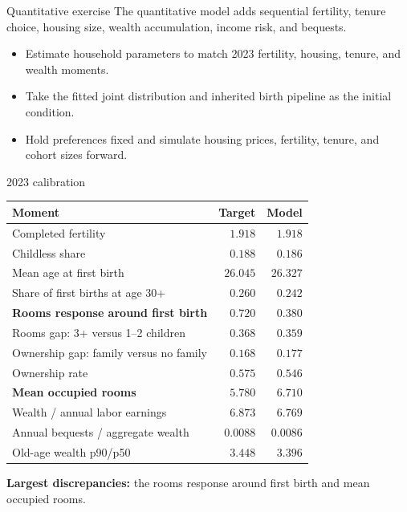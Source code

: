 \documentclass[11pt,aspectratio=169]{beamer}
\begin{document}
\begin{frame}{Quantitative exercise}
\small
The quantitative model adds sequential fertility, tenure choice, housing size, wealth accumulation, income risk, and bequests.

\begin{itemize}
  \setlength\itemsep{0.8em}
  \item Estimate household parameters to match 2023 fertility, housing, tenure, and wealth moments.
  \item Take the fitted joint distribution and inherited birth pipeline as the initial condition.
  \item Hold preferences fixed and simulate housing prices, fertility, tenure, and cohort sizes forward.
\end{itemize}
\end{frame}

\begin{frame}{2023 calibration}
\centering
\footnotesize
\renewcommand{\arraystretch}{1.00}
\begin{tabular}{@{}>{\raggedright\arraybackslash}p{}rr@{}}
\toprule
\textbf{Moment} & \textbf{Target} & \textbf{Model} \\
\midrule
Completed fertility & $1.918$ & $1.918$ \\
Childless share & $0.188$ & $0.186$ \\
Mean age at first birth & $26.045$ & $26.327$ \\
Share of first births at age 30+ & $0.260$ & $0.242$ \\
\midrule
\textbf{Rooms response around first birth} & \textbf{$0.720$} & \textbf{$0.380$} \\
Rooms gap: 3+ versus 1--2 children & $0.368$ & $0.359$ \\
Ownership gap: family versus no family & $0.168$ & $0.177$ \\
Ownership rate & $0.575$ & $0.546$ \\
\textbf{Mean occupied rooms} & \textbf{$5.780$} & \textbf{$6.710$} \\
\midrule
Wealth / annual labor earnings & $6.873$ & $6.769$ \\
Annual bequests / aggregate wealth & $0.0088$ & $0.0086$ \\
Old-age wealth p90/p50 & $3.448$ & $3.396$ \\
\bottomrule
\end{tabular}

\smallskip
\raggedright
\textbf{Largest discrepancies:} the rooms response around first birth and mean occupied rooms.
\end{frame}
\end{document}
